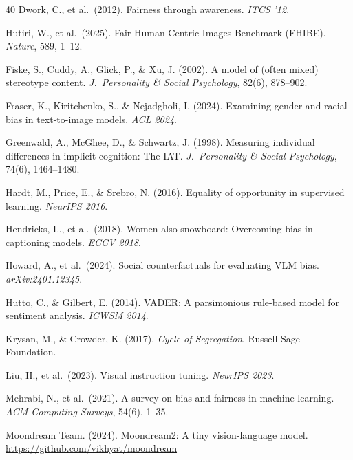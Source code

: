 \documentclass[letterpaper]{article} %
\begin{document}
\begin{thebibliography}{40}
Dwork, C., et al.\ (2012).
Fairness through awareness.
\textit{ITCS '12}.

Hutiri, W., et al.\ (2025).
Fair Human-Centric Images Benchmark (FHIBE).
\textit{Nature}, 589, 1--12.

Fiske, S., Cuddy, A., Glick, P., \& Xu, J. (2002).
A model of (often mixed) stereotype content.
\textit{J.\ Personality \& Social Psychology}, 82(6), 878--902.

Fraser, K., Kiritchenko, S., \& Nejadgholi, I. (2024).
Examining gender and racial bias in text-to-image models.
\textit{ACL 2024}.

Greenwald, A., McGhee, D., \& Schwartz, J. (1998).
Measuring individual differences in implicit cognition: The IAT.
\textit{J.\ Personality \& Social Psychology}, 74(6), 1464--1480.

Hardt, M., Price, E., \& Srebro, N. (2016).
Equality of opportunity in supervised learning.
\textit{NeurIPS 2016}.

Hendricks, L., et al.\ (2018).
Women also snowboard: Overcoming bias in captioning models.
\textit{ECCV 2018}.

Howard, A., et al.\ (2024).
Social counterfactuals for evaluating VLM bias.
\textit{arXiv:2401.12345}.

Hutto, C., \& Gilbert, E. (2014).
VADER: A parsimonious rule-based model for sentiment analysis.
\textit{ICWSM 2014}.

Krysan, M., \& Crowder, K. (2017).
\textit{Cycle of Segregation}.
Russell Sage Foundation.

Liu, H., et al.\ (2023).
Visual instruction tuning.
\textit{NeurIPS 2023}.

Mehrabi, N., et al.\ (2021).
A survey on bias and fairness in machine learning.
\textit{ACM Computing Surveys}, 54(6), 1--35.

Moondream Team. (2024).
Moondream2: A tiny vision-language model.
\url{https://github.com/vikhyat/moondream}


\end{thebibliography}
\end{document}
